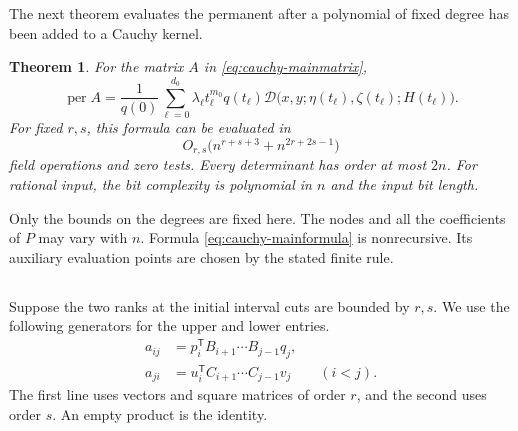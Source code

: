 \documentclass[11pt,reqno]{amsart}
\newtheorem{theorem}{Theorem}[section]
\theoremstyle{remark}
\numberwithin{equation}{section}
\newcommand{\per}{\operatorname{per}}
\newcommand{\calD}{\mathcal D}
\begin{document}
The next theorem evaluates the permanent after a polynomial of fixed
degree has been added to a Cauchy kernel.

\begin{theorem}\label{thm:cauchy}
For the matrix $A$ in \eqref{eq:cauchy-mainmatrix},
\begin{equation}\label{eq:cauchy-mainformula}
 \boxed{\displaystyle
 \per A=\frac1{q(0)}\sum_{\ell=0}^{d_0}
 \lambda_\ell t_\ell^{m_0}q(t_\ell)
 \calD\bigl(x,y;\eta(t_\ell),\zeta(t_\ell);H(t_\ell)\bigr).}
\end{equation}
For fixed $r,s$, this formula can be evaluated in
\begin{equation}\label{eq:cauchy-timebound}
 O_{r,s}\bigl(n^{r+s+3}+n^{2r+2s-1}\bigr)
\end{equation}
field operations and zero tests. Every determinant has order at most
$2n$. For rational input, the bit complexity is polynomial in $n$
and the input bit length.
\end{theorem}

Only the bounds on the degrees are fixed here. The nodes and all the
coefficients of $P$ may vary with $n$. Formula \eqref{eq:cauchy-mainformula}
is nonrecursive. Its auxiliary evaluation points are chosen by the
stated finite rule.

\subsection{}

Suppose the two ranks at the initial interval cuts are bounded
by \(r,s\). We use the following generators for the upper and
lower entries.
\begin{equation}\label{eq:generators}
 \begin{split}
 a_{ij}&=p_i^{\mathsf T} B_{i+1}\cdots B_{j-1}q_j,\\
 a_{ji}&=u_i^{\mathsf T} C_{i+1}\cdots C_{j-1}v_j
                 \qquad (i<j).
 \end{split}
\end{equation}
The first line uses vectors and square matrices of order \(r\), and
the second uses order \(s\). An empty product is the identity.
\end{document}
